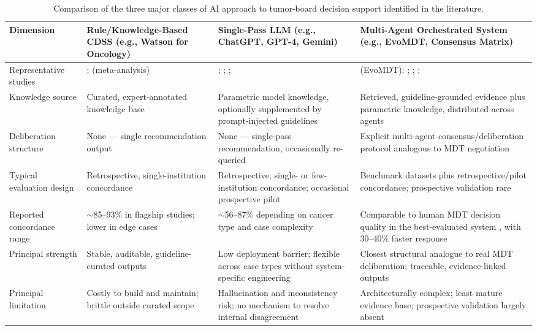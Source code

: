 \documentclass{article}
\begin{document}
\begin{table}[ht]
\centering
\caption{Comparison of the three major classes of AI approach to tumor-board decision support identified in the literature.}
\label{tab:comparison}
\small
\begin{tabular}{p{2.2cm}p{3.4cm}p{3.6cm}p{3.6cm}}
\toprule
\textbf{Dimension} & \textbf{Rule/Knowledge-Based CDSS} (e.g., Watson for Oncology) & \textbf{Single-Pass LLM} (e.g., ChatGPT, GPT-4, Gemini) & \textbf{Multi-Agent Orchestrated System} (e.g., EvoMDT, Consensus Matrix) \\
\midrule
Representative studies & \citet{somashekhar2018}; \citet{jie2021} (meta-analysis) & \citet{ismayilov2025}; \citet{chatziisaak2025}; \citet{ciulli2026}; \citet{aliyev2026} & \citet{liu2026} (EvoMDT); \citet{han2025}; \citet{saenz2026}; \citet{wang2025jco}; \citet{kuerbanjiang2025} \\
Knowledge source & Curated, expert-annotated knowledge base & Parametric model knowledge, optionally supplemented by prompt-injected guidelines & Retrieved, guideline-grounded evidence plus parametric knowledge, distributed across agents \\
Deliberation structure & None --- single recommendation output & None --- single-pass recommendation, occasionally re-queried & Explicit multi-agent consensus/deliberation protocol analogous to MDT negotiation \\
Typical evaluation design & Retrospective, single-institution concordance & Retrospective, single- or few-institution concordance; occasional prospective pilot & Benchmark datasets plus retrospective/pilot concordance; prospective validation rare \\
Reported concordance range & $\sim$85--93\% in flagship studies; lower in edge cases \cite{somashekhar2018} & $\sim$56--87\% depending on cancer type and case complexity \cite{aliyev2026,chatziisaak2025} & Comparable to human MDT decision quality in the best-evaluated system \cite{liu2026}, with 30--40\% faster response \\
Principal strength & Stable, auditable, guideline-curated outputs & Low deployment barrier; flexible across case types without system-specific engineering & Closest structural analogue to real MDT deliberation; traceable, evidence-linked outputs \\
Principal limitation & Costly to build and maintain; brittle outside curated scope \cite{wu2026} & Hallucination and inconsistency risk; no mechanism to resolve internal disagreement & Architecturally complex; least mature evidence base; prospective validation largely absent \\
\bottomrule
\end{tabular}
\end{table}
\end{document}
